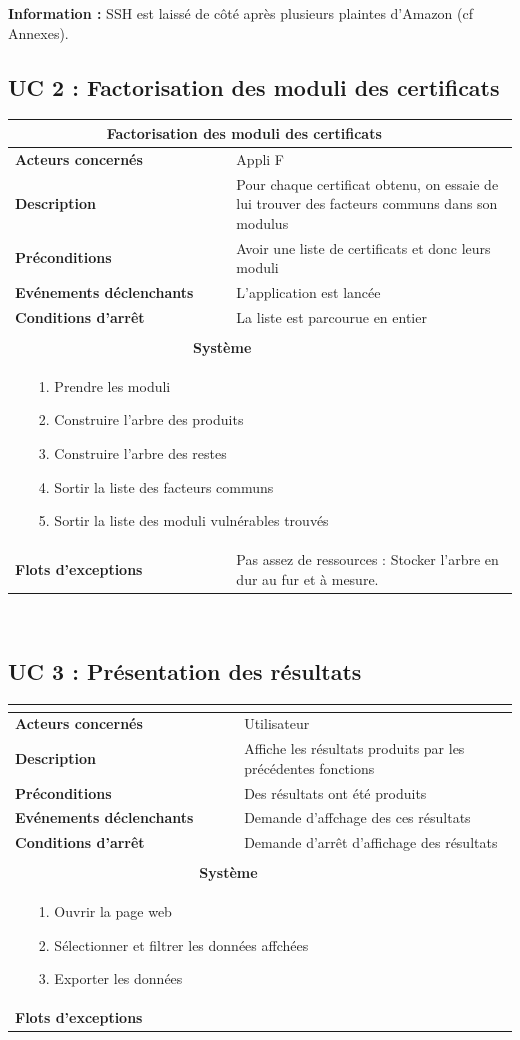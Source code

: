 \documentclass[a4paper,11pt,french]{article}
\newcommand{\fiche}[9] {
	\noindent
\begin{tabular}{|p{4cm}| p{2cm} | p{4cm} | p{.5cm} | p{7cm}|} 
\hline
\rowcolor{blue}
\multicolumn{2}{|l|}{\color{white}\bfseries{Nom}} & \multicolumn{3}{l|}{\color{white}\bfseries{#1}}\\
\hline
\multicolumn{2}{|l|}{\bfseries{Acteurs concernés}} & \multicolumn{3}{m{10.5cm}|}{#2}\\
\hline
\multicolumn{2}{|l|}{\bfseries{Description}} & \multicolumn{3}{m{10.5cm}|}{#3}\\
\hline
\multicolumn{2}{|l|}{\bfseries{Préconditions}} & \multicolumn{3}{m{10.5cm}|}{#4}\\
\hline
\multicolumn{2}{|l|}{\bfseries{Evénements déclenchants}} & \multicolumn{3}{m{10.5cm}|}{#5}\\
\hline
\multicolumn{2}{|l|}{\bfseries{Conditions d'arrêt}} & \multicolumn{3}{m{10.5cm}|}{#6}\\
\hline
\rowcolor{gray}
\multicolumn{5}{|c|}{\bfseries{Description du flot d'événements principal}}\\
\hline
\rowcolor{gray}
\multicolumn{3}{|c|}{\bfseries{Acteur(s)}} & \multicolumn{2}{c|}{\bfseries{Système}}\\
\hline
\multicolumn{3}{|p{7.5cm}|}{#7} & \multicolumn{2}{p{7.5cm}|}{#8}\\
\hline
\multicolumn{2}{|l}{\bfseries{Flots d'exceptions}} & \multicolumn{3}{|p{11.5cm}|}{#9}\\
\hline
\end{tabular}
\\
}
\begin{document}
\textbf{Information :} SSH est laissé de côté après plusieurs plaintes d'Amazon (cf Annexes).

\subsection{UC 2 : Factorisation des moduli des certificats}

\fiche
	{Factorisation des moduli des certificats} %
	{Appli F} %
	{Pour chaque certificat obtenu, on essaie de lui trouver des facteurs communs dans son modulus} %
	{Avoir une liste de certificats et donc leurs moduli} %
	{L'application est lancée} %
	{La liste est parcourue en entier} %
	{\begin{itemize}  %
		\item [1.] Prendre les moduli
		\item [2.] Construire l'arbre des produits
		\item [3.] Construire l'arbre des restes
		\item [4.] Sortir la liste des facteurs communs
		\item [5.] Sortir la liste des moduli vulnérables trouvés
	 \end{itemize}
	} 
	{\begin{itemize}  %
		\item []
		\item []
	\end{itemize}
	 }
	{Pas assez de ressources : Stocker l'arbre en dur au fur et à mesure.} %


\subsection{UC 3 : Présentation des résultats}

\fiche
	{} %
	{Utilisateur} %
	{Affiche les résultats produits par les précédentes fonctions} %
	{Des résultats ont été produits} %
	{Demande d'affchage des ces résultats} %
	{Demande d'arrêt d'affichage des résultats} %
	{\begin{itemize}  %
		\item [1.] Ouvrir la page web
		\item [2.] Sélectionner et filtrer les données affchées
		\item [3.] Exporter les données
	 \end{itemize}
	} 
	{\begin{itemize}  %
		\item []
		\item []
	\end{itemize}
	 }
	{} %
\end{document}
